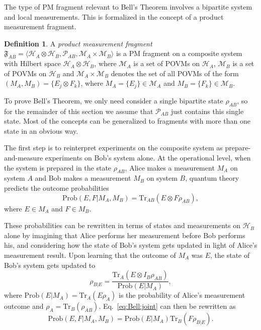 \documentclass[DIV=calc,paper=a4,fontsize=11pt,twocolumn]{scrartcl} %
\theoremstyle{definition}
\newtheorem{definition}{Definition}[section]
\theoremstyle{plain}
\newcommand{\Hilb}[1][]{\ensuremath{\mathcal{H}_{#1}}}
\newcommand{\Tr}[2][]{\ensuremath{\text{Tr}_{#1} \left ( #2 \right )}}
\begin{document}
The type of PM fragment relevant to Bell's Theorem involves a
bipartite system and local measurements.  This is formalized in the
concept of a product measurement fragment.
\begin{definition}
\label{def:Bell:PM}
A \emph{product measurement fragment} $\mathfrak{F}_{AB} = \langle
\Hilb[A] \otimes \Hilb[B], \mathcal{P}_{AB}, \mathcal{M}_A \times
\mathcal{M}_B \rangle$ is a PM fragment on a composite system with
Hilbert space $\Hilb[A] \otimes \Hilb[B]$, where $\mathcal{M}_A$ is
a set of POVMs on $\Hilb[A]$, $\mathcal{M}_B$ is a set of POVMs on
$\Hilb[B]$ and $\mathcal{M}_A \times \mathcal{M}_B$ denotes the set
of all POVMs of the form $(M_A,M_B) = \{E_j \otimes F_k\}$, where
$M_A = \{E_j\} \in \mathcal{M}_A$ and $M_B = \{F_k\} \in
\mathcal{M}_B$.
\end{definition}

To prove Bell's Theorem, we only need consider a single bipartite
state $\rho_{AB}$, so for the remainder of this section we assume that
$\mathcal{P}_{AB}$ just contains this single state.  Most of the
concepts can be generalized to fragments with more than one state in
an obvious way.

The first step is to reinterpret experiments on the composite system
as prepare-and-measure experiments on Bob's system alone.  At the
operational level, when the system is prepared in the state
$\rho_{AB}$, Alice makes a measurement $M_A$ on system $A$ and Bob
makes a measurement $M_B$ on system $B$, quantum theory predicts the
outcome probabilities
\begin{equation}
\label{eq:Bell:joint}
\text{Prob}(E,F|M_A,M_B) =  \Tr[AB]{E \otimes F
\rho_{AB}},
\end{equation}
where $E \in M_A$ and $F \in M_B$.

These probabilities can be rewritten in terms of states and
measurements on $\Hilb[B]$ alone by imagining that Alice performs her
measurement before Bob performs his, and considering how the state of
Bob's system gets updated in light of Alice's measurement result.
Upon learning that the outcome of $M_A$ was $E$, the state of Bob's
system gets updated to
\begin{equation}
\label{eq:Bell:condstate}
\rho_{B|E} = \frac{\Tr[A]{E \otimes I_B
\rho_{AB}}}{\text{Prob}(E|M_A)},
\end{equation}
where $\text{Prob}(E|M_A) = \Tr[A]{E \rho_{A}}$ is the probability
of Alice's measurement outcome and $\rho_A = \Tr[B]{\rho_{AB}}$.
Eq.~\eqref{eq:Bell:joint} can then be rewritten as
\begin{equation}
\text{Prob}(E,F|M_A,M_B) = \text{Prob}(E|M_A) \Tr[B]{F
\rho_{B|E}}.
\end{equation}
\end{document}
